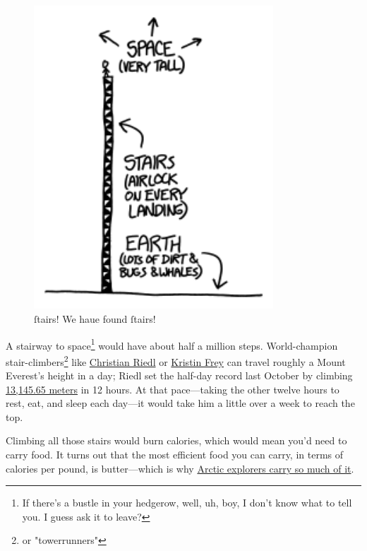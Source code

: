 {\begin{figure}[!htbp]
\centering
\includegraphics[scale=0.5, max width=0.8\textwidth]{imgs/a/126/stairs.png}
\caption{ſtairs! We haue found ſtairs!}
\end{figure}

{A stairway to space{\footnote{If there's a bustle in your hedgerow, well, uh, boy, I don't know what to tell you. I guess ask it to leave?} } would have about half a million steps. World-champion stair-climbers{\footnote{or "towerrunners"} } like \href{http://stairsport.com/12h-stair-climbing-world-record-attempt-by-christian-riedl/}{Christian Riedl} or \href{http://www.kristinfrey.com/}{Kristin Frey} can travel roughly a Mount Everest's height in a day; Riedl set the half-day record last October by climbing \href{http://www.guinnessworldrecords.com/world-records/stair-climbing-vertical-height-\%2812-hours\%29}{13,145.65 meters} in 12 hours. At that pace—taking the other twelve hours to rest, eat, and sleep each day—it would take him a little over a week to reach the top.}

{Climbing all those stairs would burn calories, which would mean you'd need to carry food. It turns out that the most efficient food you can carry, in terms of calories per pound, is butter—which is why \href{http://abcnews.go.com/Technology/GlobalWarming/story?id=4853093}{Arctic explorers carry so much of it}.}

}
